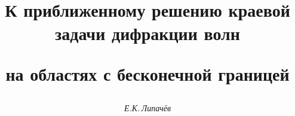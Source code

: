 




%


\newcommand{\im}{\operatorname{Im}}


\newcommand{\re}{\operatorname{Re}}


\newcommand{\tts}[1]{}


\renewcommand{\baselinestretch}{0.98}







\setcounter{page}{69}















\author{\it Е.К.\,Липач\"ев}




\title{К приближенному решению краевой задачи дифракции волн


на областях с бесконечной границей}





\date{}




\pagestyle{plain} %







\maketitle


\label{begin}





